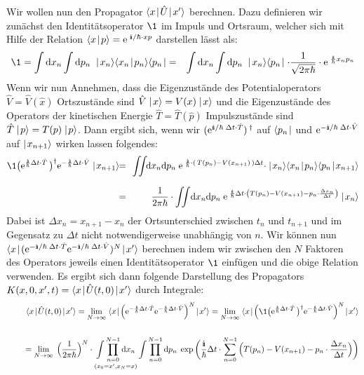 Wir wollen nun den Propagator $\bracket{x}{\hat{U}}{x'}$ berechnen. Dazu definieren wir zunächst den Identitätsoperator $\1$ im Impuls und Ortsraum, welcher sich mit Hilfe der Relation $\braket{x}{p}=\e^{\;\I/\hbar\cdot xp}$ darstellen lässt als: 
\begin{eqnarray*}
	\1 = \int\mathrm{d}x_n\int\mathrm{d}p_n\; \ket{x_n}\braket{x_n}{p_n}\bra{p_n} &=& \int\mathrm{d}x_n \int\mathrm{d}p_n\;\ket{x_n}\bra{p_n}\cdot \frac{1}{\sqrt{2\pi\hbar}}\cdot\e^{\;\frac{\I}{\hbar}x_np_n}
\end{eqnarray*}
Wenn wir nun Annehmen, dass die Eigenzustände des Potentialoperators $\hat{V}=\hat{V}(\hat{x})$ Ortszustände sind $\hat{V}\mid\!\!\!\,\,{x}\rangle =V(x)\mid\!\!\!\,\,{x}\rangle$ und die Eigenzustände des Operators der kinetischen Energie $\hat{T}=\hat{T}(\hat{p})$ Impulszustände sind $\hat{T}\mid\!\!\!\,\,{p}\rangle=T(p)\mid\!\!\!\,\,{p}\rangle$. Dann ergibt sich, wenn wir $(\e^{\I/\hbar\;\Delta t\cdot\hat{T}})\,^{\dagger}$ auf $\langle{p_n}\!\!\!\,\,\mid$ und $\e^{-\I/\hbar\;\Delta t\cdot\hat{V}}$ auf $\mid\!\!\!\,\,{x_{n+1}}\rangle$ wirken lassen folgendes: 
\begin{eqnarray*}
	\1\big(\e^{\frac{\I}{\hbar} \Delta t\cdot\hat{T}}\,\big)^\dagger\e^{-\frac{\I}{\hbar}\Delta t\cdot\hat{V}} \ket{x_{n+1}} \!\!&=&\!\! \underset{\;}{\iint}\!\mathrm{d}x_n\mathrm{d}p_n\;\e^{\;\frac{\I}{\hbar}\cdot(\,T(p_n)-V(x_{n+1})\,) \Delta t}\cdot\ket{x_n}\braket{x_n}{p_n}\braket{p_n}{x_{n+1}} 
	\\
	&=&\!\! \frac{1}{2\pi\hbar}\cdot\iint\!\mathrm{d}x_n\mathrm{d}p_n\; \e^{\;\frac{\I}{\hbar}\Delta t\cdot\left(T(p_n)-V(x_{n+1})-p_n\cdot\frac{\Delta x_n}{\Delta t}\right)}\ket{x_n} 
\end{eqnarray*}
Dabei ist $\Delta x_n=x_{n+1}-x_n$ der Ortsunterschied zwischen $t_n$ und $t_{n+1}$ und im Gegensatz zu $\Delta t$ nicht notwendigerweise unabhängig von $n$. Wir können nun $\bracket{x}{(\e^{-\I/\hbar\;\Delta t\cdot\hat{T}}\e^{-\I/\hbar\;\Delta t\cdot\hat{V}})^N}{x'}$ berechnen indem wir zwischen den $N$ Faktoren des Operators jeweils einen Identitätsoperator $\1$ einfügen und die obige Relation verwenden. Es ergibt sich dann folgende Darstellung des Propagators $K(x,0,x',t)=\bracket{x}{\hat{U}(t,0)}{x'}$ durch Integrale: 
\begin{eqnarray*}
	&&\!\!\!\!\!\!\!\!\!\bracket{x}{\hat{U}(t,0)}{x'} = \lim_{N\to\infty}\;\bracket{x}{\Big(\e^{-\frac{\I}{\hbar}\Delta t\cdot\hat{T}}\e^{-\frac{\I}{\hbar}\Delta t\cdot\hat{V}}\Big)^N}{x'} = \lim_{N\to\infty}\;\bracket{x}{\Big( \1\big(\e^{\frac{\I}{\hbar} \Delta t\cdot\hat{T}}\,\big)^\dagger\e^{-\frac{\I}{\hbar}\Delta t\cdot\hat{V}} \Big)^N}{x'}
	\\\;\\
	&&\quad = \lim_{N\to\infty}\;\Big(\frac{1}{2\pi\hbar}\Big)^N\cdot \underset{(x_0=x',x_N=x)}{\int\prod_{n=0}^{N-1}\mathrm{d}x_n}\int\prod_{n=0}^{N-1}\mathrm{d}p_n\;\exp\bigg(\frac{\I}{\hbar}\Delta t\cdot\sum_{n=0}^{N-1}\Big(T(p_n)-V(x_{n+1})-p_n\cdot\frac{\Delta x_n}{\Delta t} \Big)\bigg)
\end{eqnarray*}
